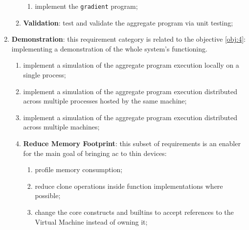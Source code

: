 \begin{enumerate}
\begin{enumerate}
\begin{enumerate}
                        \item implement the \texttt{gradient} program;
                    \end{enumerate}
              \item \textbf{Validation}: test and validate the aggregate program via unit testing;
          \end{enumerate}
    \item \textbf{Demonstration}: this requirement category is related to the objective \ref{obj:4}: implementing a demonstration of the whole system's functioning.
          \begin{enumerate}
              \item implement a simulation of the aggregate program execution locally on a single process;
              \item implement a simulation of the aggregate program execution distributed across multiple processes hosted by the same machine;
              \item implement a simulation of the aggregate program execution distributed across multiple machines;
              \item \textbf{Reduce Memory Footprint}: this subset of requirements is an enabler for the main goal of bringing \ac{ac} to thin devices:
                    \begin{enumerate}
                        \item profile memory consumption;
                        \item reduce clone operations inside function implementations where possible;
                        \item change the core constructs and builtins to accept references to the Virtual Machine instead of owning it;
                    \end{enumerate}
          \end{enumerate}
\end{enumerate}
